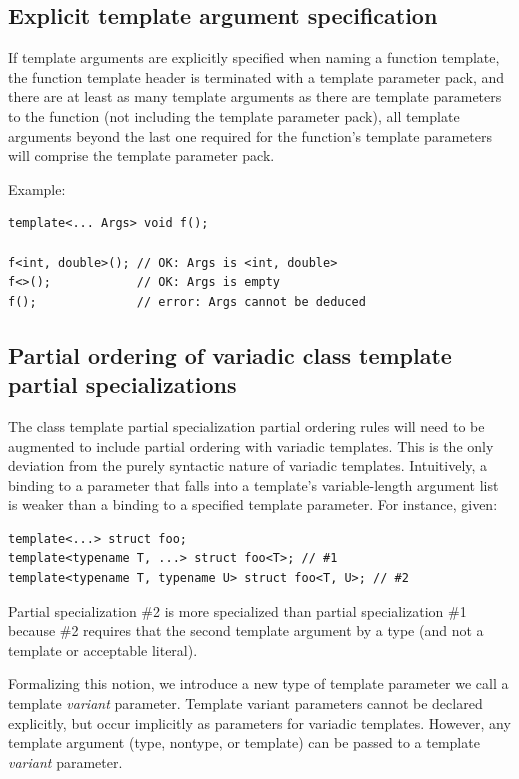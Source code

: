 \documentclass{article}
\begin{document}
\subsection{Explicit template argument specification}
If template arguments are explicitly specified when naming a function
template, the function template header is terminated with a template
parameter pack, and there are at least as many template arguments as
there are template parameters to the function (not including the
template parameter pack), all template arguments beyond the last one
required for the function's template parameters will comprise the
template parameter pack.

Example:
\begin{verbatim}
template<... Args> void f();

f<int, double>(); // OK: Args is <int, double>
f<>();            // OK: Args is empty
f();              // error: Args cannot be deduced
\end{verbatim}

\subsection{Partial ordering of variadic class template partial specializations}
The class template partial specialization partial ordering rules will
need to be augmented to include partial ordering with variadic
templates. This is the only deviation from the purely syntactic nature
of variadic templates. Intuitively, a binding to a parameter that
falls into a template's variable-length argument list is weaker than a
binding to a specified template parameter. For instance, given:

\begin{verbatim}
template<...> struct foo;
template<typename T, ...> struct foo<T>; // #1
template<typename T, typename U> struct foo<T, U>; // #2
\end{verbatim}

Partial specialization \#2 is more specialized than partial
specialization \#1 because \#2 requires that the second template
argument by a type (and not a template or acceptable
literal). 

Formalizing this notion, we introduce a new type of template
parameter we call a template {\em variant} parameter. Template variant
parameters cannot be declared explicitly, but occur implicitly as
parameters for variadic templates. However, any template argument
(type, nontype, or template) can be passed to a template {\em variant}
parameter. 
\end{document}
